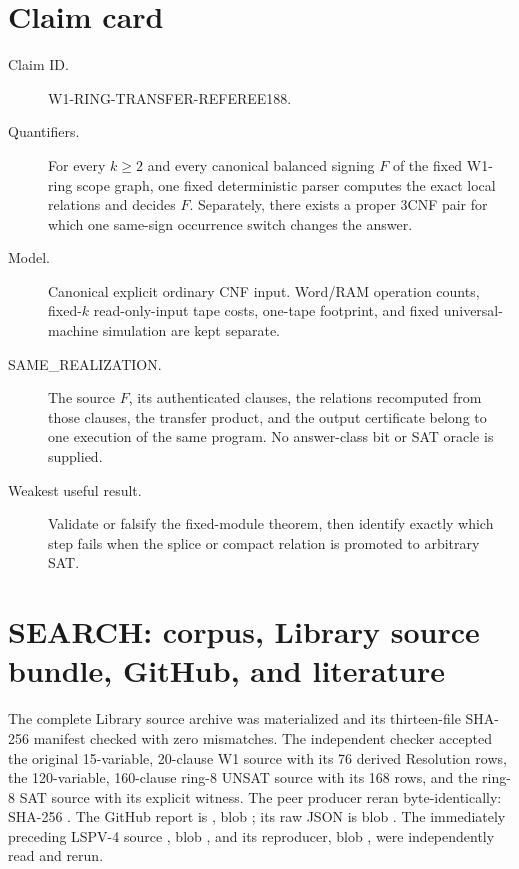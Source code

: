 \documentclass[11pt]{article}
\begin{document}
\section{Claim card}
\begin{description}
\item[Claim ID.] W1-RING-TRANSFER-REFEREE188.
\item[Quantifiers.] For every $k\ge2$ and every canonical balanced signing
$F$ of the fixed W1-ring scope graph, one fixed deterministic parser computes
the exact local relations and decides $F$. Separately, there exists a proper
3CNF pair for which one same-sign occurrence switch changes the answer.
\item[Model.] Canonical explicit ordinary CNF input. Word/RAM operation
counts, fixed-$k$ read-only-input tape costs, one-tape footprint, and fixed
universal-machine simulation are kept separate.
\item[SAME\_REALIZATION.] The source $F$, its authenticated clauses, the
relations recomputed from those clauses, the transfer product, and the output
certificate belong to one execution of the same program. No answer-class bit
or SAT oracle is supplied.
\item[Weakest useful result.] Validate or falsify the fixed-module theorem,
then identify exactly which step fails when the splice or compact relation is
promoted to arbitrary SAT.
\end{description}

\section{SEARCH: corpus, Library source bundle, GitHub, and literature}
The complete Library source archive
was materialized and its thirteen-file SHA-256 manifest checked with zero
mismatches. The independent checker accepted the original 15-variable,
20-clause W1 source with its 76 derived Resolution rows, the 120-variable,
160-clause ring-8 UNSAT source with its 168 rows, and the ring-8 SAT source
with its explicit witness. The peer producer reran byte-identically:
SHA-256
.
The GitHub report is
,
blob ; its raw JSON is blob
. The immediately preceding LSPV-4 source
, blob
, and its reproducer, blob
, were independently read and rerun.
\end{document}
